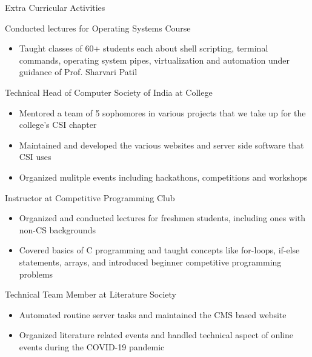 \documentclass{article}
\newlength{\tabin}
\newlength{\secsep}
\newcommand{\lineunder}{\vspace*{-8pt} \\ \hspace*{-6pt} \hrulefill \\ \vspace*{-15pt}}
\newenvironment{tabbedsection}[1]{
	\begin{list}{}{
		\setlength{\itemsep}{0pt}
		\setlength{\labelsep}{0pt}
		\setlength{\labelwidth}{0pt}
		\setlength{\leftmargin}{\tabin}
		\setlength{\rightmargin}{\tabin}
		\setlength{\listparindent}{0pt}
		\setlength{\parsep}{0pt}
		\setlength{\parskip}{0pt}
		\setlength{\partopsep}{0pt}
		\setlength{\topsep}{#1}
	}
	\item[]
}{\end{list}}
\newenvironment{resume_section}[1]{
	\vspace{2\secsep}
	\textsc{\large#1}
	\lineunder
	\begin{tabbedsection}{\secsep}
}{\end{tabbedsection}}
\newenvironment{resume_subsection}[2][]{
	\textbf{#2} \hfill {\footnotesize #1} \hspace{2em}
	\begin{tabbedsection}{0.5\secsep}
}{\end{tabbedsection}}
\newenvironment{subitems}{
	\renewcommand{\labelitemi}{-}
	\begin{itemize}
		\setlength{\labelsep}{1em}
}{\end{itemize}}
\begin{document}
\begin{resume_section}{Extra Curricular Activities}

	\begin{resume_subsection}{Conducted lectures for Operating Systems Course}
		\begin{subitems}
			\item   Taught classes of 60+ students each about shell
				scripting, terminal commands, operating system
				pipes, virtualization and automation under
				guidance of Prof. Sharvari Patil
		\end{subitems}
	\end{resume_subsection}

	\begin{resume_subsection}{Technical Head of Computer Society of India at College}
		\begin{subitems}
			\item Mentored a team of 5 sophomores in various
				projects that we take up for the college's CSI
				chapter
			\item Maintained and developed the various websites and server
				side software that CSI uses
			\item Organized mulitple events including hackathons, competitions and workshops
		\end{subitems}
	\end{resume_subsection}

	\begin{resume_subsection}{Instructor at Competitive Programming Club}
		\begin{subitems}
			\item   Organized and conducted lectures for freshmen
				students, including ones with non-CS
				backgrounds
			\item   Covered basics of C programming and taught
				concepts like for-loops, if-else statements,
				arrays, and introduced beginner competitive
				programming problems
		\end{subitems}
	\end{resume_subsection}

	\begin{resume_subsection}{Technical Team Member at Literature Society}
		\begin{subitems}
		\item Automated routine server tasks and maintained the CMS based website
		\item Organized literature related events and handled technical
			aspect of online events during the COVID-19 pandemic
		\end{subitems}
	\end{resume_subsection}
\end{resume_section}
\end{document}
